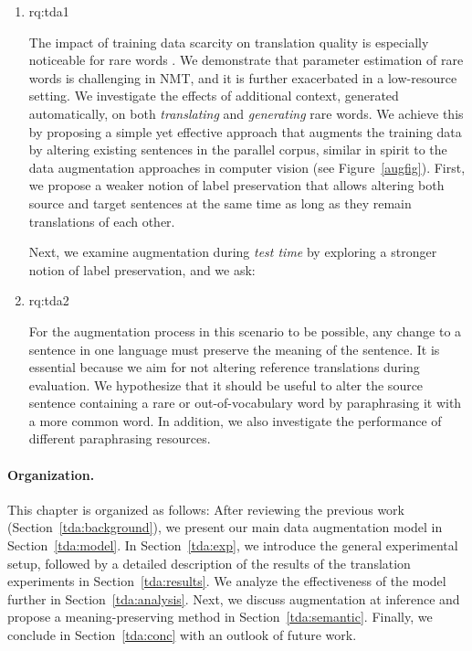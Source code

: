 \begin{enumerate}[label=\textbf{RQ2.\arabic* },wide = 0pt, leftmargin=2em]
\setlength\itemsep{1em}
\item \acl{rq:tda1}

\medskip

\noindent The impact of training data scarcity on translation quality is especially noticeable for rare words \citep{sennrich-haddow-birch:2016:P16-12}. 
We demonstrate that parameter estimation of rare words is challenging in NMT, and it is further exacerbated in a low-resource setting.
We investigate the effects of additional context, generated automatically, on both \textit{translating} and \textit{generating} rare words. 
We achieve this by proposing a simple yet effective approach that augments the training data by altering existing sentences in the parallel corpus, similar in spirit to the data augmentation approaches in computer vision (see Figure~\ref{augfig}).
First, we propose a weaker notion of label preservation that allows altering both source and target sentences at the same time as long as they remain translations of each other. 

Next, we examine augmentation during \textit{test time} by exploring a stronger notion of label preservation, and we ask: 

\item \acl{rq:tda2}

\medskip

\noindent For the augmentation process in this scenario to be possible, any change to a sentence in one language must preserve the meaning of the sentence.  
It is essential because we aim for not altering reference translations during evaluation. 
We hypothesize that it should be useful to alter the source sentence containing a rare or out-of-vocabulary word by paraphrasing it with a more common word.
In addition, we also investigate the performance of different paraphrasing resources.

\end{enumerate}


\paragraph{Organization.} This chapter is organized as follows: 
After reviewing the previous work (Section~\ref{tda:background}), we present our main data augmentation model in Section~\ref{tda:model}. 
In Section~\ref{tda:exp}, we introduce the general experimental setup, followed by a detailed description of the results of the translation experiments in Section~\ref{tda:results}. 
We analyze the effectiveness of the model further in Section~\ref{tda:analysis}.
Next, we discuss augmentation at inference and propose a meaning-preserving method in Section~\ref{tda:semantic}. 
Finally, we conclude in Section~\ref{tda:conc} with an outlook of future work.


